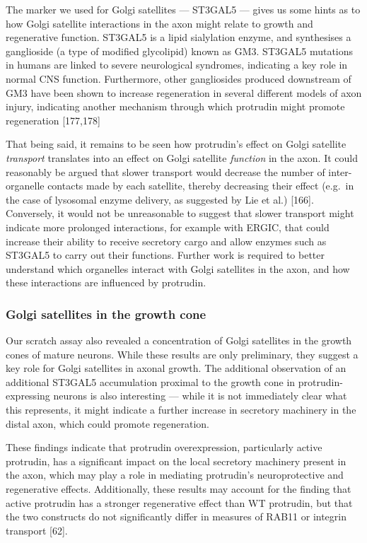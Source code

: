 \documentclass[
  12pt,
  a4paper,
]{book}
\begin{document}
The marker we used for Golgi satellites --- ST3GAL5 --- gives us some hints as to how Golgi satellite interactions in the axon might relate to growth and regenerative function. ST3GAL5 is a lipid sialylation enzyme, and synthesises a ganglioside (a type of modified glycolipid) known as GM3. ST3GAL5 mutations in humans are linked to severe neurological syndromes, indicating a key role in normal CNS function. Furthermore, other gangliosides produced downstream of GM3 have been shown to increase regeneration in several different models of axon injury, indicating another mechanism through which protrudin might promote regeneration {[}177,178{]}

That being said, it remains to be seen how protrudin's effect on Golgi satellite \emph{transport} translates into an effect on Golgi satellite \emph{function} in the axon. It could reasonably be argued that slower transport would decrease the number of inter-organelle contacts made by each satellite, thereby decreasing their effect (e.g.~in the case of lysosomal enzyme delivery, as suggested by Lie et al.) {[}166{]}. Conversely, it would not be unreasonable to suggest that slower transport might indicate more prolonged interactions, for example with ERGIC, that could increase their ability to receive secretory cargo and allow enzymes such as ST3GAL5 to carry out their functions. Further work is required to better understand which organelles interact with Golgi satellites in the axon, and how these interactions are influenced by protrudin.

\subsubsection{Golgi satellites in the growth cone}\label{golgi-satellites-in-the-growth-cone}

Our scratch assay also revealed a concentration of Golgi satellites in the growth cones of mature neurons. While these results are only preliminary, they suggest a key role for Golgi satellites in axonal growth. The additional observation of an additional ST3GAL5 accumulation proximal to the growth cone in protrudin-expressing neurons is also interesting --- while it is not immediately clear what this represents, it might indicate a further increase in secretory machinery in the distal axon, which could promote regeneration.

These findings indicate that protrudin overexpression, particularly active protrudin, has a significant impact on the local secretory machinery present in the axon, which may play a role in mediating protrudin's neuroprotective and regenerative effects. Additionally, these results may account for the finding that active protrudin has a stronger regenerative effect than WT protrudin, but that the two constructs do not significantly differ in measures of RAB11 or integrin transport {[}62{]}.
\end{document}
